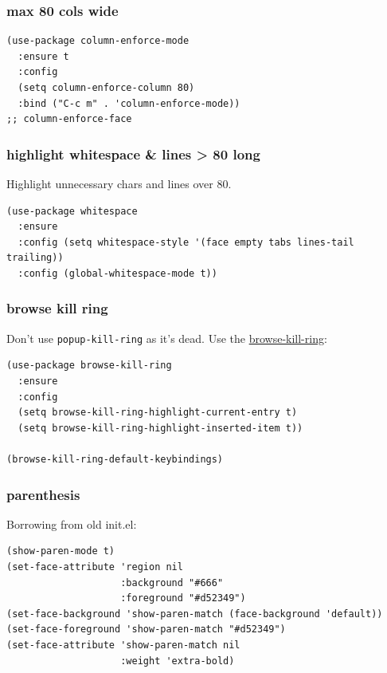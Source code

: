 \documentclass[11pt]{article}
\begin{document}
\subsubsection{max 80 cols wide}
\label{sec:org4e2cdec}
\begin{verbatim}
(use-package column-enforce-mode
  :ensure t
  :config
  (setq column-enforce-column 80)
  :bind ("C-c m" . 'column-enforce-mode))
;; column-enforce-face
\end{verbatim}
\subsubsection{highlight whitespace \& lines > 80 long}
\label{sec:org0bf5c0c}
Highlight unnecessary chars and lines over 80.
\begin{verbatim}
(use-package whitespace
  :ensure
  :config (setq whitespace-style '(face empty tabs lines-tail trailing))
  :config (global-whitespace-mode t))
\end{verbatim}

\subsubsection{browse kill ring}
\label{sec:orgb035017}

Don't use \texttt{popup-kill-ring} as it's dead. Use the \href{https://github.com/browse-kill-ring/browse-kill-ring}{browse-kill-ring}:

\begin{verbatim}
(use-package browse-kill-ring
  :ensure
  :config
  (setq browse-kill-ring-highlight-current-entry t)
  (setq browse-kill-ring-highlight-inserted-item t))

(browse-kill-ring-default-keybindings)
\end{verbatim}
\subsubsection{parenthesis}
\label{sec:org9b165b3}

Borrowing from old init.el:

\begin{verbatim}
(show-paren-mode t)
(set-face-attribute 'region nil
                    :background "#666"
                    :foreground "#d52349")
(set-face-background 'show-paren-match (face-background 'default))
(set-face-foreground 'show-paren-match "#d52349")
(set-face-attribute 'show-paren-match nil
                    :weight 'extra-bold)
\end{verbatim}
\end{document}
